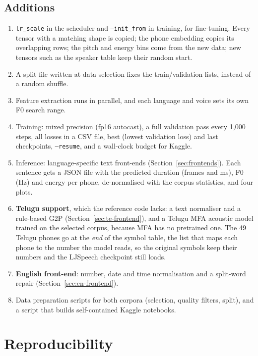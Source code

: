 \documentclass[11pt,a4paper]{article}
\newcommand{\code}[1]{\texttt{#1}}
\begin{document}
\subsection*{Additions}
\begin{enumerate}[resume]
\item \code{lr\_scale} in the scheduler and \code{--init\_from} in training, for fine-tuning. Every tensor with a
matching shape is copied; the phone embedding copies its overlapping rows; the pitch and energy bins come from the
new data; new tensors such as the speaker table keep their random start.
\item A split file written at data selection fixes the train/validation lists, instead of a random shuffle.
\item Feature extraction runs in parallel, and each language and voice sets its own F0 search range.
\item Training: mixed precision (fp16 autocast), a full validation pass every 1,000 steps, all losses in a CSV
file, best (lowest validation loss) and last checkpoints, \code{--resume}, and a wall-clock budget for Kaggle.
\item Inference: language-specific text front-ends (Section~\ref{sec:frontends}). Each sentence gets a JSON file with the predicted duration
(frames and ms), F0 (Hz) and energy per phone, de-normalised with the corpus statistics, and four plots.
\item \textbf{Telugu support}, which the reference code lacks: a text normaliser and a rule-based G2P
(Section~\ref{sec:te-frontend}), and a Telugu MFA acoustic model trained on the selected corpus, because MFA has no
pretrained one. The 49 Telugu phones go at the \emph{end} of the symbol table, the list that maps each phone to the
number the model reads, so the original symbols keep their numbers and the LJSpeech checkpoint still loads.
\item \textbf{English front-end}: number, date and time normalisation and a split-word repair
(Section~\ref{sec:en-frontend}).
\item Data preparation scripts for both corpora (selection, quality filters, split), and a script that builds
self-contained Kaggle notebooks.
\end{enumerate}

\section{Reproducibility}
\label{sec:repro}
\end{document}

